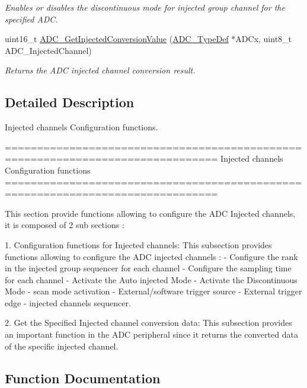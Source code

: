 \begin{DoxyCompactItemize}
\begin{DoxyCompactList}\small\item\em Enables or disables the discontinuous mode for injected group channel for the specified A\+DC. \end{DoxyCompactList}\item 
uint16\+\_\+t \hyperlink{group___a_d_c___group6_ga1dea5ed24571a2e0ce4cbd41c9c1ec46}{A\+D\+C\+\_\+\+Get\+Injected\+Conversion\+Value} (\hyperlink{struct_a_d_c___type_def}{A\+D\+C\+\_\+\+Type\+Def} $\ast$A\+D\+Cx, uint8\+\_\+t A\+D\+C\+\_\+\+Injected\+Channel)
\begin{DoxyCompactList}\small\item\em Returns the A\+DC injected channel conversion result. \end{DoxyCompactList}\end{DoxyCompactItemize}


\subsection{Detailed Description}
Injected channels Configuration functions. 

\begin{DoxyVerb} ===============================================================================
                     Injected channels Configuration functions
 ===============================================================================  

  This section provide functions allowing to configure the ADC Injected channels,
  it is composed of 2 sub sections : 
    
  1. Configuration functions for Injected channels: This subsection provides 
     functions allowing to configure the ADC injected channels :    
    - Configure the rank in the injected group sequencer for each channel
    - Configure the sampling time for each channel    
    - Activate the Auto injected Mode  
    - Activate the Discontinuous Mode 
    - scan mode activation  
    - External/software trigger source   
    - External trigger edge 
    - injected channels sequencer.
    
   2. Get the Specified Injected channel conversion data: This subsection 
      provides an important function in the ADC peripheral since it returns the 
      converted data of the specific injected channel.\end{DoxyVerb}
 

\subsection{Function Documentation}
